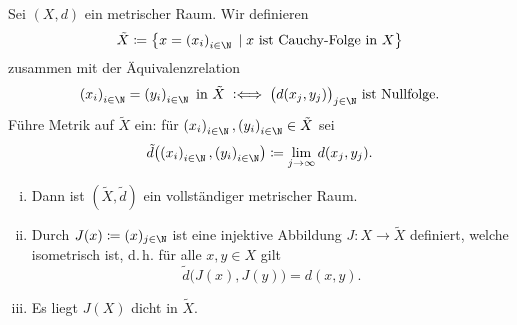 \begin{thEmpty}[Vervollständigung]
    Sei $(X,d)$ ein metrischer Raum. Wir definieren 
    \[  \tilde X \defeq 
        \bigl\{ x = \iSeq x \Mid x \text{ ist Cauchy-Folge in $X$} \bigr\}
    \]
    zusammen mit der Äquivalenzrelation
    \[ \iSeq x = \iSeq y \text{ in $\tilde X$} \;\defiff\; \bigl( d(x_j,y_j)
        \bigr)_{j\in\N} \text{ ist Nullfolge}
    . \]
    Führe Metrik auf $\tilde X$ ein: für $\iSeq x,\iSeq y\in\tilde X$ sei
    \[ \tilde d\bigl( \iSeq x, \iSeq y \bigr) \defeq
        \lim_{j\to\infty} d(x_j,y_j)
    . \]
    
    \nnSatz
    \begin{enumerate}[i)]
        \item \label{vl04:satz2.18-i}
            Dann ist $(\tilde X,\tilde d)$ ein vollständiger metrischer Raum.
        \item \label{vl04:satz2.18-ii}
            Durch $J(x) \defeq (x)_{j\in\N}$ ist eine injektive Abbildung
            $J\colon X\to\tilde X$ definiert, welche isometrisch ist, d.\,h.
            für alle $x,y\in X$ gilt
            \[ \tilde d\bigl( J(x), J(y) \bigr) = d(x,y) . \]
        \item \label{vl04:satz2.18-iii}
            Es liegt $J(X)$ dicht in $\tilde X$.
    \end{enumerate}
\end{thEmpty}

